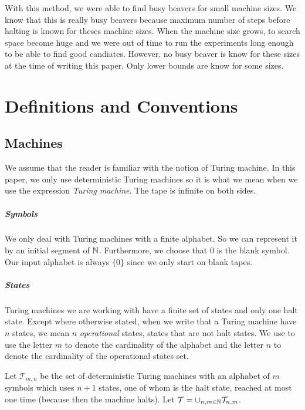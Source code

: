 \documentclass{report}
\begin{document}
With this method, we were able to find busy beavers for small machine sizes. We know that this is really busy beavers because maximum number of steps before halting is known for theses machine sizes. When the machine size grows, to search space become huge and we were out of time to run the experiments long enough to be able to find good candiates. However, no busy beaver is know for these sizes at the time of writing this paper. Only lower bounds are know for some sizes.

\chapter{Definitions and Conventions}
\label{chap:pre}

\section{Machines}
\label{sec:ma}

We assume that the reader is familiar with the notion of Turing machine. In this paper, we only use deterministic Turing machines so it is what we mean when we use the expression \emph{Turing machine}. The tape is infinite on both sides.

\paragraph{Symbols}
We only deal with Turing machines with a finite alphabet. So we can represent it by an initial segment of $\mathbb{N}$. Furthermore, we choose that $0$ is the blank symbol. Our input alphabet is always $\{0\}$ since we only start on blank tapes. 

\paragraph{States}
Turing machines we are working with have a finite set of states and only one halt state.
 Except where otherwise stated, when we write that a Turing machine have $n$ states, we mean $n$ \emph{operational} states, \ie states that are not halt states. We use to use the letter $m$ to denote the cardinality of the alphabet and the letter $n$ to denote the cardinality of the operational states set.

 Let $\mathcal{T}_{m,n}$ be the set of deterministic Turing machines with an alphabet of $m$ symbols which uses $n + 1$ states, one of whom is the halt state, reached at most one time (because then the machine halts). Let  $\mathcal{T} = \cup_{n,m \in \mathbb{N}} \mathcal{T}_{n,m}$.
\end{document}
